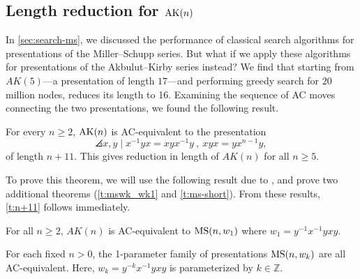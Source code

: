 

\subsection{Length reduction for $\text{AK}(n)$}
\label{sec:len-reduction}

In \cref{sec:search-ms}, we discussed the performance of classical search algorithms for presentations of the Miller--Schupp series. But what if we apply these algorithms for presentations of the Akbulut--Kirby series instead? We find that starting from $AK(5)$---a presentation of length $17$---and performing greedy search for $20$ million nodes, reduces its length to 16. Examining the sequence of AC moves connecting the two presentations, we found the following result.

\begin{theorem}\label{t:n+11}
	For every $n\geq 2$, $\text{AK}(n)$ is AC-equivalent to the presentation
	\[
	\angles{ x,y \mid x^{-1} y x = x y x^{-1} y \ ,\  xyx=yx^{n-1}y },
	\]
	of length $n+11$. This gives reduction in length of $AK(n)$ for all $n \geq 5$.
\end{theorem}

To prove this theorem, we will  use the following result due to \cite{MMS}, and prove two additional theorems (\cref{t:mswk_wk1} and \cref{t:ms-short}). From these results, \cref{t:n+11} follows immediately. 

\begin{proposition}
    \label{t:MS-AK-MS}
    For all $n \geq 2$, $AK(n)$ is AC-equivalent to $\text{MS}(n, w_1)$ where $w_1 = y^{-1} x^{-1} y x y$.
\end{proposition}

\begin{theorem}\label{t:mswk_wk1}
    For each fixed $n > 0$, the 1-parameter family of presentations $\text{MS}(n, w_k)$ are all AC-equivalent. Here, $w_k = y^{-k} x^{-1} y x y$ is parameterized by $k \in \mathbb{Z}$. 
\end{theorem}


